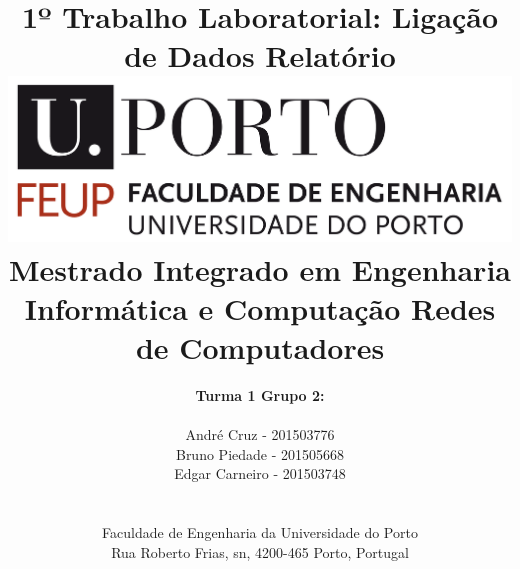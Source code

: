 \documentclass[a4paper, 11pt]{article}
\begin{document}
\setlength{\textwidth}{16cm}
\setlength{\textheight}{22cm}

\title{\Huge\textbf{1º Trabalho Laboratorial:}\linebreak\linebreak
\Huge\textbf{Ligação de Dados}\linebreak\linebreak\linebreak
\Large\textbf{Relatório}\linebreak\linebreak
\linebreak\linebreak
\includegraphics[scale=0.1]{images/feup-logo.png}\linebreak\linebreak
\linebreak
\Large{Mestrado Integrado em Engenharia Informática e Computação} \linebreak\linebreak
\Large{Redes de Computadores}\linebreak
}

\author{\textbf{Turma 1 Grupo 2:}\\
\linebreak\\
André Cruz - 201503776 \\
Bruno Piedade - 201505668 \\
Edgar Carneiro - 201503748 \\
\linebreak\linebreak \\
 \\ Faculdade de Engenharia da Universidade do Porto \\ Rua Roberto Frias, s\/n, 4200-465 Porto, Portugal \linebreak\linebreak
\linebreak\linebreak\vspace{1cm}}
\end{document}
